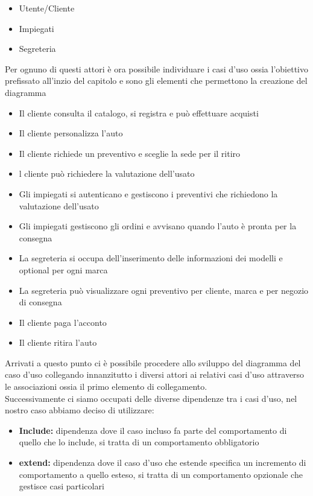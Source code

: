 \documentclass[a4paper, 11pt,oneside,]{book}
\newcommand{\spacing}{\par\bigskip\noindent}
\begin{document}
        \begin{itemize}
            \item Utente/Cliente
            \item Impiegati
            \item Segreteria
        \end{itemize}
        Per ognuno di questi attori è ora possibile individuare i casi d'uso ossia l'obiettivo prefissato all'inzio del capitolo e sono gli elementi che  permettono la creazione del diagramma
        \begin{itemize}
            \item Il cliente consulta il catalogo, si registra e può effettuare acquisti
            \item Il cliente personalizza l'auto
            \item Il cliente richiede un preventivo e sceglie la sede per il ritiro
            \item l cliente può richiedere la valutazione dell'usato
            \item Gli impiegati si autenticano e gestiscono i preventivi che richiedono la valutazione dell'usato
            \item Gli impiegati  gestiscono gli ordini e avvisano quando l'auto è pronta per la consegna
            \item La segreteria si occupa dell'inserimento delle informazioni dei modelli e optional per ogni marca
            \item La segreteria può visualizzare ogni preventivo per cliente, marca e per negozio di consegna
            \item Il cliente paga l'acconto
            \item Il cliente ritira l'auto
        \end{itemize}
        \spacing
        Arrivati a questo punto ci è possibile procedere allo sviluppo del diagramma del caso d'uso collegando innanzitutto i diversi attori ai relativi casi d'uso attraverso le associazioni ossia il primo elemento di collegamento.\\
        Successivamente ci siamo occupati delle diverse dipendenze tra i casi d'uso, nel nostro caso abbiamo deciso di utilizzare:
        \begin{itemize}
            \item \textbf{Include:} dipendenza dove il caso incluso fa parte del comportamento di quello che lo include, si tratta di un comportamento obbligatorio
            \item \textbf{extend:} dipendenza dove il caso d'uso che estende specifica un incremento di comportamento a quello esteso, si tratta di un comportamento opzionale che gestisce casi particolari
        \end{itemize}
\end{document}
